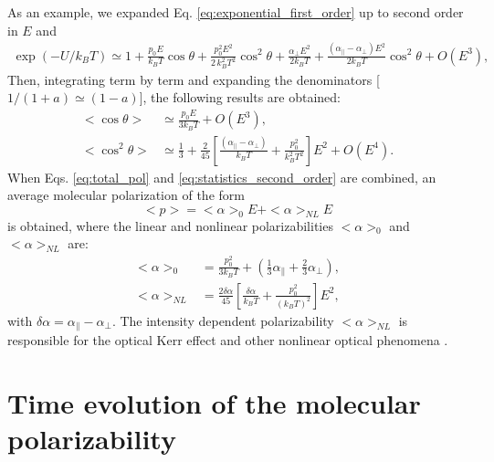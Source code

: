 \documentclass[12pt,letterpaper]{article}
\begin{document}
As an example, we expanded Eq. \eqref{eq:exponential_first_order} up to second order in $E$ and  
\begin{align}\label{eq:exponential_second_order}
  \exp(-U/k_BT)\simeq 1+\frac{p_0E}{k_BT}\cos\theta+ \frac{p_0^2E^2}{2\,k_B^2T^2}\cos^2\theta + \frac{\alpha_\bot E^2}{2k_BT} +
\frac{\left(\alpha_\parallel - \alpha_\bot\right) E^2}{2k_BT}\cos^2\theta+ O(E^3),
\end{align}
Then, integrating term by term and expanding the denominators [$1/(1+a)\simeq (1-a)$], the following results are obtained:
\begin{subequations}\label{eq:statistics_second_order}
 \begin{align}
  <\cos\theta>&\simeq \frac{p_0E}{3k_BT} + O(E^3),\\
  <\cos^2\theta>&\simeq\frac{1}{3}+\frac{2}{45}\left[\frac{\left(\alpha_\parallel-\alpha_\bot\right)}{k_BT} +\frac{p_0^2}{k_B^2T^2}\right]E^2 + O(E^4).
 \end{align}
\end{subequations}
When Eqs. \eqref{eq:total_pol} and \eqref{eq:statistics_second_order} are combined, an average molecular polarization of the form 
\begin{equation}\label{eq:pol_nonlinear}
<p>=<\alpha>_0E + <\alpha>_{NL}E
\end{equation}
is obtained, where the linear and nonlinear polarizabilities $<\alpha>_0$ and $<\alpha>_{NL}$ are: 
\begin{subequations}\label{eq:alpha_linear_nonlinear}
\begin{align}\label{eq:alpha_linear}
  <\alpha>_0 &= \frac{p_0^2}{3k_BT}+\left(\frac{1}{3}\alpha_\parallel+\frac{2}{3}\alpha_\bot\right),\\
  <\alpha>_{NL} &= \frac{2\delta\alpha}{45}\left[\frac{\delta\alpha}{k_BT}+\frac{p_0^2}{(k_BT)^2}\right]E^2,
\end{align}
\end{subequations}
with $\delta\alpha = \alpha_\parallel - \alpha_\bot$.
The intensity dependent polarizability $<\alpha>_{NL}$ is responsible for the optical Kerr effect and other nonlinear optical phenomena \cite{boyd2008}.

\section{Time evolution of the molecular polarizability}\label{time}

 

\end{document}
